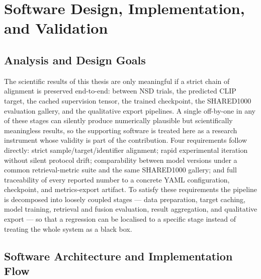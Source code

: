 
\chapter{Software Design, Implementation, and Validation}
\label{chap:implementation}

\section{Analysis and Design Goals}

The scientific results of this thesis are only meaningful if a strict chain of alignment is preserved end-to-end: between NSD trials, the predicted CLIP target, the cached supervision tensor, the trained checkpoint, the SHARED1000 evaluation gallery, and the qualitative export pipelines. A single off-by-one in any of these stages can silently produce numerically plausible but scientifically meaningless results, so the supporting software is treated here as a research instrument whose validity is part of the contribution. Four requirements follow directly: strict sample/target/identifier alignment; rapid experimental iteration without silent protocol drift; comparability between model versions under a common retrieval-metric suite and the same SHARED1000 gallery; and full traceability of every reported number to a concrete YAML configuration, checkpoint, and metrics-export artifact. To satisfy these requirements the pipeline is decomposed into loosely coupled stages --- data preparation, target caching, model training, retrieval and fusion evaluation, result aggregation, and qualitative export --- so that a regression can be localised to a specific stage instead of treating the whole system as a black box.

\section{Software Architecture and Implementation Flow}

